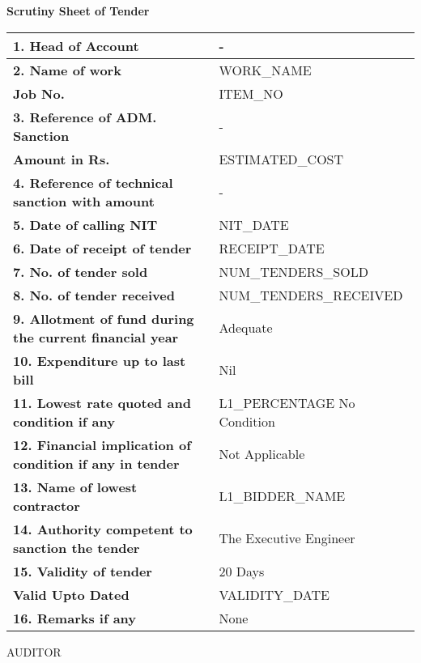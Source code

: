 \documentclass[a4paper]{article}
\begin{document}
\begin{center}
    \textbf{Scrutiny Sheet of Tender}
\end{center}

\begin{tabular}{|p{}|p{}|}
    \hline
    \textbf{1. Head of Account} & - \\
    \hline
    \textbf{2. Name of work} & {WORK_NAME} \\
    \textbf{Job No.} & {ITEM_NO} \\
    \hline
    \textbf{3. Reference of ADM. Sanction} & - \\
    \textbf{Amount in Rs.} & {ESTIMATED_COST} \\
    \hline
    \textbf{4. Reference of technical sanction with amount} & - \\
    \hline
    \textbf{5. Date of calling NIT} & {NIT_DATE} \\
    \hline
    \textbf{6. Date of receipt of tender} & {RECEIPT_DATE} \\
    \hline
    \textbf{7. No. of tender sold} & {NUM_TENDERS_SOLD} \\
    \hline
    \textbf{8. No. of tender received} & {NUM_TENDERS_RECEIVED} \\
    \hline
    \textbf{9. Allotment of fund during the current financial year} & Adequate \\
    \hline
    \textbf{10. Expenditure up to last bill} & Nil \\
    \hline
    \textbf{11. Lowest rate quoted and condition if any} & {L1_PERCENTAGE} \quad No Condition \\
    \hline
    \textbf{12. Financial implication of condition if any in tender} & Not Applicable \\
    \hline
    \textbf{13. Name of lowest contractor} & {L1_BIDDER_NAME} \\
    \hline
    \textbf{14. Authority competent to sanction the tender} & The Executive Engineer \\
    \hline
    \textbf{15. Validity of tender} & 20 Days \\
    \textbf{Valid Upto Dated} & {VALIDITY_DATE} \\
    \hline
    \textbf{16. Remarks if any} & None \\
    \hline
\end{tabular}

\vspace{1cm}
\begin{flushleft}
    AUDITOR
\end{flushleft}
\end{document}
